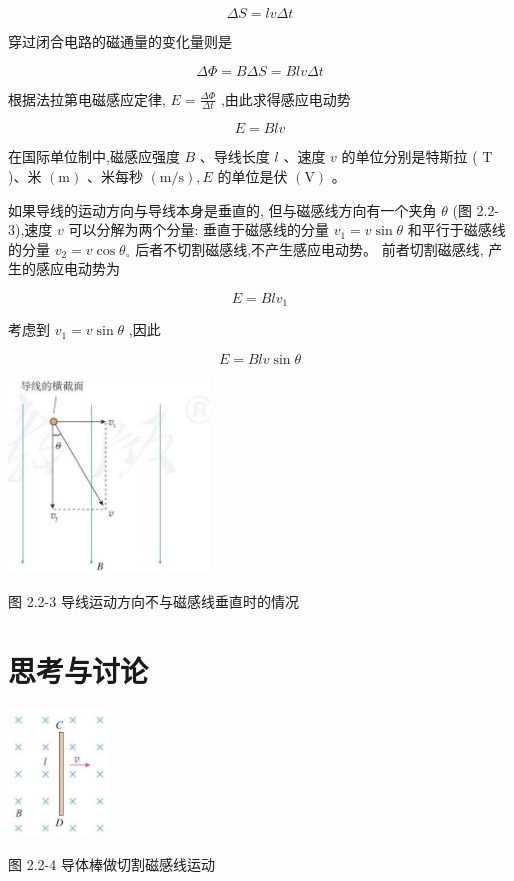 \documentclass[10pt]{article}
\begin{document}
\[
{\Delta S} = {lv\Delta t}
\]

穿过闭合电路的磁通量的变化量则是

\[
{\Delta \Phi } = {B\Delta S} = {Blv\Delta t}
\]

根据法拉第电磁感应定律, \(E = \frac{\Delta \Phi }{\Delta t}\) ,由此求得感应电动势

\[
E = {Blv}
\]

在国际单位制中,磁感应强度 \(B\) 、导线长度 \(l\) 、速度 \(v\) 的单位分别是特斯拉 ( \(\mathrm{T}\) )、米 \(\left( \mathrm{m}\right)\) 、米每秒 \(\left( {\mathrm{m}/\mathrm{s}}\right) ,E\) 的单位是伏 \(\left( \mathrm{V}\right)\) 。

如果导线的运动方向与导线本身是垂直的, 但与磁感线方向有一个夹角 \(\theta\) (图 2.2-3),速度 \(v\) 可以分解为两个分量: 垂直于磁感线的分量 \({v}_{1} = v\sin \theta\) 和平行于磁感线的分量 \({v}_{2} = v\cos {\theta }_{ \circ }\) 后者不切割磁感线,不产生感应电动势。 前者切割磁感线, 产生的感应电动势为

\[
E = {Bl}{v}_{1}
\]

考虑到 \({v}_{1} = v\sin \theta\) ,因此

\[
E = {Blv}\sin \theta
\]

\begin{center}
\includegraphics[max width=0.4\textwidth]{images/01910e72-c5b7-7ed5-a6d4-fb3a5faefc32_37_796293.jpg}
\end{center}

图 2.2-3 导线运动方向不与磁感线垂直时的情况

\section*{思考与讨论}

\begin{mdframed}

\begin{center}
\includegraphics[max width=0.2\textwidth]{images/01910e72-c5b7-7ed5-a6d4-fb3a5faefc32_38_341416.jpg}
\end{center}

图 2.2-4 导体棒做切割磁感线运动

\end{mdframed}
\end{document}
